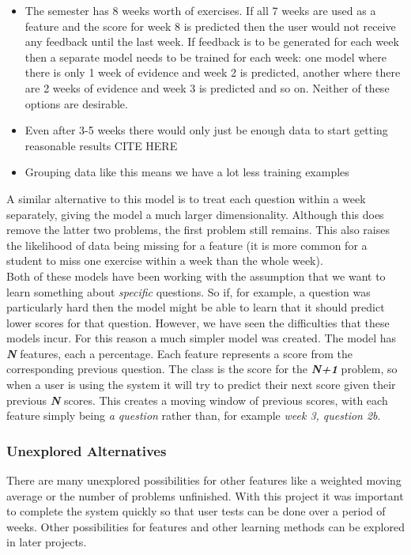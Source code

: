 \begin{itemize}
\item The semester has 8 weeks worth of exercises. If all 7 weeks are used as a feature and the score for week 8 is predicted then the user would not receive any feedback until the last week. If feedback is to be generated for each week then a separate model needs to be trained for each week: one model where there is only 1 week of evidence and week 2 is predicted, another where there are 2 weeks of evidence and week 3 is predicted and so on. Neither of these options are desirable.
\item Even after 3-5 weeks there would only just be enough data to start getting reasonable results CITE HERE %
\item Grouping data like this means we have a lot less training examples
\end{itemize}

A similar alternative to this model is to treat each question within a week separately, giving the model a much larger dimensionality. Although this does remove the latter two problems, the first problem still remains. This also raises the likelihood of data being missing for a feature (it is more common for a student to miss one exercise within a week than the whole week).
\\
Both of these models have been working with the assumption that we want to learn something about \emph{specific} questions. So if, for example, a question was particularly hard then the model might be able to learn that it should predict lower scores for that question. However, we have seen the difficulties that these models incur. For this reason a much simpler model was created. The model has \textit{\textbf{N}} features, each a percentage. Each feature represents a score from the corresponding previous question. The class is the score for the \textit{\textbf{N+1}} problem, so when a user is using the system it will try to predict their next score given their previous \textit{\textbf{N}} scores. This creates a moving window of previous scores, with each feature simply being \emph{a question} rather than, for example \emph{week 3, question 2b}.

\subsubsection{Unexplored Alternatives}
There are many unexplored possibilities for other features like a weighted moving average or the number of problems unfinished. With this project it was important to complete the system quickly so that user tests can be done over a period of weeks. Other possibilities for features and other learning methods can be explored in later projects.


